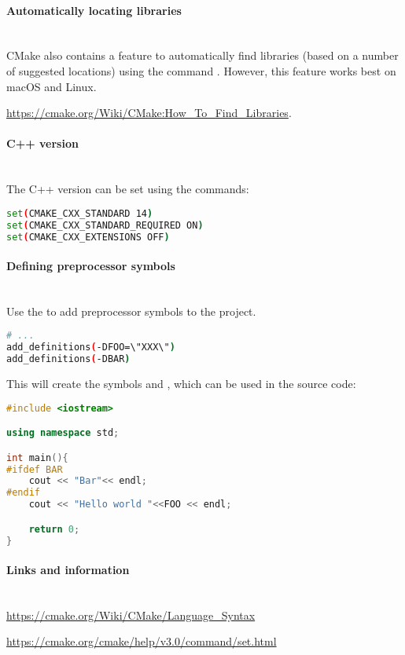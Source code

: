 \documentclass[11pt,a4paper,landscape]{scrartcl} %
\newcommand{\sectiontitle}[1]{\paragraph{#1} \ \\} %
\begin{document}
\begin{multicols}{2}


\sectiontitle{Automatically locating libraries}

CMake also contains a feature to automatically find libraries (based on a number of suggested locations) using the command . However, this feature works best on macOS and Linux. 

\url{https://cmake.org/Wiki/CMake:How_To_Find_Libraries}.

\sectiontitle{C++ version}

The C++ version can be set using the commands:

\begin{lstlisting}[language=bash]
set(CMAKE_CXX_STANDARD 14)
set(CMAKE_CXX_STANDARD_REQUIRED ON)
set(CMAKE_CXX_EXTENSIONS OFF)
\end{lstlisting}

\sectiontitle{Defining preprocessor symbols}

Use the  to add preprocessor symbols to the project.

\begin{lstlisting}[language=bash]
# ...
add_definitions(-DFOO=\"XXX\")
add_definitions(-DBAR)
\end{lstlisting}

This will create the symbols  and , which can be used in the source code:

\begin{lstlisting}[language=c++]
#include <iostream>

using namespace std;

int main(){
#ifdef BAR
    cout << "Bar"<< endl;
#endif
    cout << "Hello world "<<FOO << endl;

    return 0;
}
\end{lstlisting}

\vspace{\baselineskip} %


\sectiontitle{Links and information}

\url{https://cmake.org/Wiki/CMake/Language_Syntax}

\url{https://cmake.org/cmake/help/v3.0/command/set.html}


\end{multicols}
\end{document}
